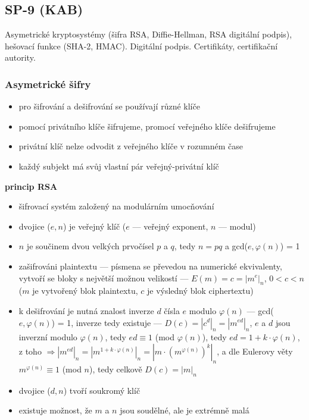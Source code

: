 \subsection{SP-9 (KAB)}
Asymetrické kryptosystémy (šifra RSA, Diffie-Hellman, RSA digitální podpis), hešovací funkce (SHA-2, HMAC). Digitální podpis. Certifikáty, certifikační autority.

\subsubsection*{Asymetrické šifry}
\begin{itemize}
	\item pro šifrování a dešifrování se používají různé klíče
	\item pomocí privátního klíče šifrujeme, promocí veřejného klíče dešifrujeme
	\item privátní klíč nelze odvodit z veřejného klíče v rozumném čase
	\item každý subjekt má svůj vlastní pár veřejný-privátní klíč
\end{itemize}
\textbf{princip RSA}
\begin{itemize}
	\item šifrovací systém založený na modulárním umocňování
	\item dvojice ($e, n$) je veřejný klíč ($e$ --- veřejný exponent, $n$ --- modul)
	\item $n$ je součinem dvou velkých prvočísel $p$ a $q$, tedy $n = pq$ a gcd($e, \varphi(n)$) = 1
	\item zašifrováni plaintextu --- písmena se převedou na numerické ekvivalenty, vytvoří se bloky s největší možnou velikostí --- $E(m) = c = |m^e|_n$, $0 < c < n$ ($m$ je vytvořený blok plaintextu, $c$ je výsledný blok ciphertextu)
	\item k dešifrování je nutná znalost inverze $d$ čísla $e$ modulo $\varphi(n)$ --- gcd($e, \varphi(n)$) = 1, inverze tedy existuje --- $D(c) = |c^d|_n = |m^{ed}|_n$, $e$ a $d$ jsou inverzní modulo $\varphi(n)$, tedy $ed \equiv 1$ (mod $\varphi(n)$), tedy $ed = 1 + k \cdot \varphi(n)$, z toho $\Rightarrow |m^{ed}|_n = |m^{1 + k \cdot \varphi(n)}|_n = |m \cdot (m^{\varphi(n)})^{k}|_n$, a dle Eulerovy věty $m^{\varphi(n)} \equiv 1$ (mod $n$), tedy celkově $D(c) = |m|_n$
	
	\item dvojice ($d, n$) tvoří soukromý klíč 
	
	\item existuje možnost, že $m$ a $n$ jsou soudělné, ale je extrémně malá
\end{itemize}

